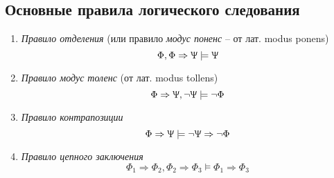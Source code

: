 \subsection*{Основные правила логического следования}
\begin{enumerate}
    \item \textit{Правило отделения} (или правило \textit{модус поненс} -- от лат. modus ponens)
    $$\Phi,\Phi\Rightarrow\Uppsi\models\Uppsi$$
    \item \textit{Правило модус толенс} (от лат. modus tollens)
    $$\Phi\Rightarrow\Uppsi, \lnot\Uppsi\models\lnot\Phi$$
    \item \textit{Правило контрапозиции}
    $$\Phi\Rightarrow\Uppsi\models\lnot\Uppsi\Rightarrow\lnot\Phi$$
    \item \textit{Правило цепного заключения}
    $$\Phi_1\Rightarrow\Phi_2,\Phi_2\Rightarrow\Phi_3\models\Phi_1\Rightarrow\Phi_3$$
\end{enumerate}